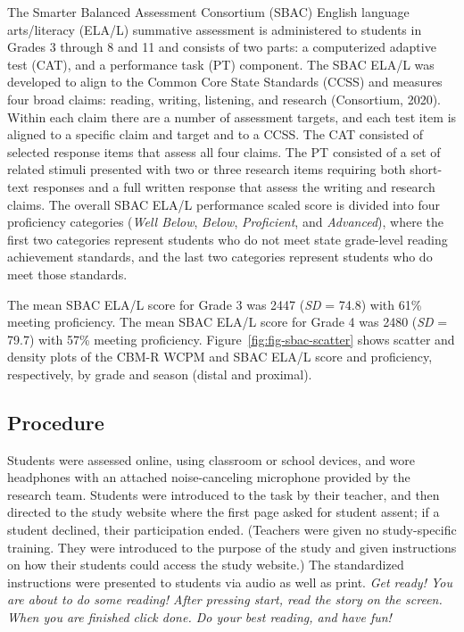 \documentclass[
  english,
  man, fleqn, noextraspace]{apa6}
\begin{document}
The Smarter Balanced Assessment Consortium (SBAC) English language arts/literacy (ELA/L) summative assessment is administered to students in Grades 3 through 8 and 11 and consists of two parts: a computerized adaptive test (CAT), and a performance task (PT) component. The SBAC ELA/L was developed to align to the Common Core State Standards (CCSS) and measures four broad claims: reading, writing, listening, and research (Consortium, 2020). Within each claim there are a number of assessment targets, and each test item is aligned to a specific claim and target and to a CCSS. The CAT consisted of selected response items that assess all four claims. The PT consisted of a set of related stimuli presented with two or three research items requiring both short-text responses and a full written response that assess the writing and research claims. The overall SBAC ELA/L performance scaled score is divided into four proficiency categories (\emph{Well Below}, \emph{Below}, \emph{Proficient}, and \emph{Advanced}), where the first two categories represent students who do not meet state grade-level reading achievement standards, and the last two categories represent students who do meet those standards.

The mean SBAC ELA/L score for Grade 3 was 2447 (\emph{SD} = 74.8) with 61\% meeting proficiency. The mean SBAC ELA/L score for Grade 4 was 2480 (\emph{SD} = 79.7) with 57\% meeting proficiency. Figure~\ref{fig:fig-sbac-scatter} shows scatter and density plots of the CBM-R WCPM and SBAC ELA/L score and proficiency, respectively, by grade and season (distal and proximal).




\hypertarget{procedure}{%
\subsection{Procedure}\label{procedure}}

Students were assessed online, using classroom or school devices, and wore headphones with an attached noise-canceling microphone provided by the research team. Students were introduced to the task by their teacher, and then directed to the study website where the first page asked for student assent; if a student declined, their participation ended. (Teachers were given no study-specific training. They were introduced to the purpose of the study and given instructions on how their students could access the study website.) The standardized instructions were presented to students via audio as well as print. \emph{Get ready! You are about to do some reading! After pressing start, read the story on the screen. When you are finished click done. Do your best reading, and have fun!}
\end{document}
